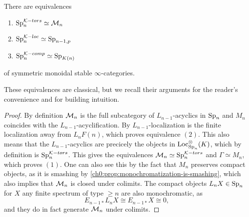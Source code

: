\begin{proposition}
    \label{ch0:prop:torsion-is-monochromatic}
    There are equivalences
    \begin{enumerate}
        \item $\mathrm{Sp}_{n}^{\mathcal{K}-tors}\simeq \mathcal{M}_{n}$
        \item $\mathrm{Sp}_{n}^{\mathcal{K}-loc}\simeq \mathrm{Sp}_{n-1,p}$
        \item $\mathrm{Sp}_{n}^{\mathcal{K}-comp}\simeq \mathrm{Sp}_{{K(n)}}$
    \end{enumerate} 
    of symmetric monoidal stable $\infty$-categories. 
\end{proposition}

These equivalences are classical, but we recall their arguments for the reader's convenience and for building intuition. 

\begin{proof}
    By definition $\mathcal{M}_{n}$ is the full subcategory of $L_{n-1}$-acyclics in $\mathrm{Sp}_{n}$ and $M_n$ coincides with the $L_{n-1}$-acyclification. By \cite[6.10]{hovey-strickland_99} $L_{n-1}$-localization is the finite localization away from $L_nF(n)$, which proves equivalence $(2)$. This also means that the $L_{n-1}$-acyclics are precicely the objects in $\operatorname{Loc}^\otimes_{\mathrm{Sp}_{n}}(K)$, which by definition is $\mathrm{Sp}_{n}^{\mathcal{K}-tors}$. This gives the equivalences $\mathcal{M}_{n} \simeq \mathrm{Sp}_{n}^{\mathcal{K}-tors}$ and $\Gamma \simeq M_n$, which proves $(1)$. One can also see this by the fact that $M_n$ preserves compact objects, as it is smashing by \cref{ch0:prop:monochromatization-is-smashing}, which also implies that $\mathcal{M}_{n}$ is closed under colimits. The compact objects $L_n X\in \mathrm{Sp}_{n}$ for $X$ any finite spectrum of type $\geq n$ are also monochromatic, as 
    \[E_{n-1 *} L_n X \cong E_{n-1 *}X\cong 0,\]
    and they do in fact generate $\mathcal{M}_{n}$ under colimits. 



    

\end{proof}
